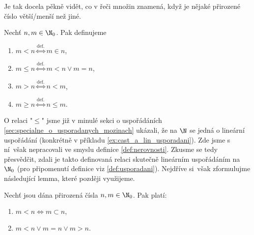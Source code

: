 Je tak docela pěkně vidět, co v řeči množin znamená, když je nějaké přirozené číslo větší/menší než jiné.
\begin{definition}\label{def:nerovnosti}
    Nechť $n,m\in\N_0$. Pak definujeme
    \begin{enumerate}[label=(\roman*)]
        \item $m<n\stackrel{\text{def.}}{\iff}m\in n$,
        \item $m\leq n\stackrel{\text{def.}}{\iff}m<n\lor m=n$,
        \item $m>n\stackrel{\text{def.}}{\iff}n<m$,
        \item $m\geq n\stackrel{\text{def.}}{\iff}n\leq m$.
    \end{enumerate}
\end{definition}
O relaci "$\leq$" jsme již v minulé sekci o uspořádáních \ref{sec:specialne_o_usporadanych_mozinach} ukázali, že na $\N$ se jedná o lineární uspořádání (konkrétně v příkladu \ref{ex:cast_a_lin_usporadani}). Zde jsme s ní~však nepracovali ve smyslu definice \ref{def:nerovnosti}. Zkusme se tedy přesvědčit, zdali je takto definovaná relaci skutečně lineárním uspořádáním na $\N_0$ (pro připomenutí definice viz \ref{def:usporadani}). Nejdříve si~však zformulujme následující lemma, které později využijeme.
\begin{lemma}\label{lem:vlastnosti_prirozenych_cisel_2}
    Nechť jsou dána přirozená čísla $n,m\in\N_0$. Pak platí:
    \begin{enumerate}[label=(\roman*)]
        \item\label{item:vlastnost_2_1} $m<n\iff m\subset n$,
        \item\label{item:vlastnost_2_2} $m<n \lor m=n \lor m>n$.
    \end{enumerate}
\end{lemma}
